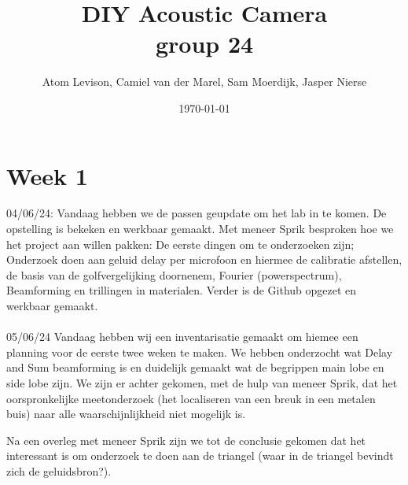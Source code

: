 \documentclass{article}
\title{%
  DIY Acoustic Camera \\
  \Minutes group 24 }
\author{Atom Levison, Camiel van der Marel, Sam Moerdijk, Jasper Nierse}
\date{\today}
\begin{document}
\maketitle

\section{Week 1}
04/06/24:
Vandaag hebben we de passen geupdate om het lab in te komen. 
De opstelling is bekeken en werkbaar gemaakt.
Met meneer Sprik besproken hoe we het project aan willen pakken: De eerste dingen om te onderzoeken zijn; Onderzoek doen aan geluid delay per microfoon en hiermee de
calibratie afstellen, de basis van de golfvergelijking doornenem, Fourier (powerspectrum), Beamforming en trillingen in materialen.
Verder is de Github opgezet en werkbaar gemaakt.\\
\\
05/06/24
Vandaag hebben wij een inventarisatie gemaakt om hiemee een planning voor de eerste twee weken te maken.
We hebben onderzocht wat Delay and Sum beamforming is en duidelijk gemaakt wat de begrippen main lobe en side lobe zijn. 
We zijn er achter gekomen, met de hulp van meneer Sprik, dat het oorspronkelijke meetonderzoek (het localiseren van een breuk in een metalen buis) naar alle waarschijnlijkheid niet mogelijk is. 

Na een overleg met meneer Sprik zijn we tot de conclusie gekomen dat het interessant is om onderzoek te doen aan de triangel (waar in de triangel bevindt zich de geluidsbron?).
\end{document}
